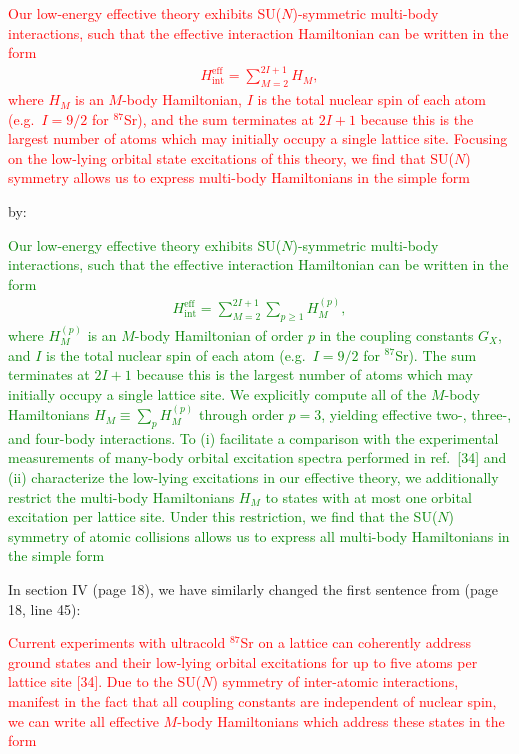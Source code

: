 \documentclass[preprint]{revtex4-1}
\renewcommand{\t}{\text} %
\newcommand{\1}{\mathds{1}}
\newcommand{\red}[1]{\textcolor{red}{#1}}
\newcommand{\green}[1]{\textcolor{green}{#1}}
\begin{document}
\begin{enumerate}
  \red{Our low-energy effective theory exhibits SU($N$)-symmetric
    multi-body interactions, such that the effective interaction
    Hamiltonian can be written in the form
    \begin{align*}
      H_{\t{int}}^{\t{eff}} = \sum_{M=2}^{2I+1} H_M, \tag{9}
    \end{align*}
    where $H_M$ is an $M$-body Hamiltonian, $I$ is the total nuclear
    spin of each atom (e.g.~$I=9/2$ for ${}^{87}$Sr), and the sum
    terminates at $2I+1$ because this is the largest number of atoms
    which may initially occupy a single lattice site.  Focusing on the
    low-lying orbital state excitations of this theory, we find that
    SU($N$) symmetry allows us to express multi-body Hamiltonians in
    the simple form}

  by:

  \green{Our low-energy effective theory exhibits SU($N$)-symmetric
    multi-body interactions, such that the effective interaction
    Hamiltonian can be written in the form
    \begin{align*}
      H_{\t{int}}^{\t{eff}} = \sum_{M=2}^{2I+1} \sum_{p\ge1} H_M^{(p)},
      \tag{9}
    \end{align*}
    where $H_M^{(p)}$ is an $M$-body Hamiltonian of order $p$ in the
    coupling constants $G_X$, and $I$ is the total nuclear spin of
    each atom (e.g.~$I=9/2$ for ${}^{87}$Sr).  The sum terminates at
    $2I+1$ because this is the largest number of atoms which may
    initially occupy a single lattice site.  We explicitly compute all
    of the $M$-body Hamiltonians $H_M\equiv\sum_p H_M^{(p)}$ through
    order $p=3$, yielding effective two-, three-, and four-body
    interactions.  To (i) facilitate a comparison with the
    experimental measurements of many-body orbital excitation spectra
    performed in ref.~[34] and (ii) characterize the low-lying
    excitations in our effective theory, we additionally restrict the
    multi-body Hamiltonians $H_M$ to states with at most one orbital
    excitation per lattice site.  Under this restriction, we find that
    the SU($N$) symmetry of atomic collisions allows us to express all
    multi-body Hamiltonians in the simple form}

  In section IV (page 18), we have similarly changed the first
  sentence from (page 18, line 45):

  \red{Current experiments with ultracold ${}^{87}$Sr on a lattice can
    coherently address ground states and their low-lying orbital
    excitations for up to five atoms per lattice site [34].  Due to
    the SU($N$) symmetry of inter-atomic interactions, manifest in the
    fact that all coupling constants are independent of nuclear spin,
    we can write all effective $M$-body Hamiltonians which address
    these states in the form}


\end{enumerate}
\end{document}
